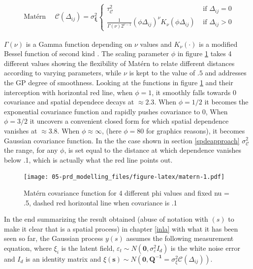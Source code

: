 \documentclass[
  12pt,
  a4paper,
  oneside]{book}
\theoremstyle{definition}
\theoremstyle{definition}
\theoremstyle{definition}
\theoremstyle{remark}
\begin{document}
\[
\begin{aligned}
\text { Matérn } \quad \mathscr{C}( \Delta_{i j})= \sigma_{\mathscr{\boldsymbol{\mathbf{\xi}}}}^{2} \left\{\begin{array}{cl}
\tau^{2}_{\mathscr{C}} & \text { if } \Delta_{i j}=0 \\
\frac{1}{\Gamma(\nu) 2^{\nu-1}}\left(\phi \Delta_{i j}\right)^{\nu} K_{\nu}\left(\phi \Delta_{i j}\right)& \text { if } \Delta_{i j}>0
\end{array}\right.
\end{aligned}
\]

\(\Gamma(\nu)\) is a Gamma function depending on \(\nu\) values and \(K_{\nu}(\cdot)\) is a modified Bessel function of second kind \citep{yaşar2016unified}. The scaling parameter \(\phi\) in figure \ref{fig:matern} takes 4 different values showing the flexibility of Matérn to relate different distances according to varying parameters, while \(\nu\) is kept to the value of \(.5\) and addresses the GP degree of smoothness.
Looking at the functions in figure \ref{fig:matern} and their interception with horizontal red line, when \(\phi = 1\), it smoothly falls towards 0 covariance and spatial dependece decays at \(\approx 2.3\). When \(\phi = 1/2\) it becomes the exponential covariance function and rapidly pushes covariance to 0, When \(\phi = 3/2\) it uncovers a convenient closed form \citep{LecturePaci} for which spatial dependence vanishes at \(\approx 3.8\). When \(\phi \approx \infty\), (here \(\phi = 80\) for graphics reasons), it becomes Gaussian covariance function. In the the case shown in section \ref{spdeapproach} \(\sigma_{\mathscr{C}}^{2}\) the range, for any \(\phi\), is set equal to the distance at which dependence vanishes below .1, which is actually what the red line points out.

\begin{figure}
\centering
\texttt{[image: 05-prd\_modelling\_files/figure-latex/matern-1.pdf]}
\caption{\label{fig:matern}Matérn covariance function for 4 different phi values and fixed nu = .5, dashed red horizontal line when covariance is .1}
\end{figure}

In the end summarizing the result obtained (abuse of notation with \((s)\) to make it clear that is a spatial process) in chapter \ref{inla} with what it has been seen so far, the Gaussian process \(y(s)\) assumes the following measurement equation, where \(\xi_{i}\) is the latent field, \(\varepsilon_{t} \sim N\left(\mathbf{0}, \sigma_{\varepsilon}^{2} I_{d}\right)\) is the white noise error and \(I_{d}\) is an identity matrix and \(\xi(\boldsymbol{s})\sim N\left(\mathbf{0}, \boldsymbol{Q^{-1}}=\sigma_{\xi}^{2} \mathscr{C}( \Delta_{i j})\right)\).
\end{document}
